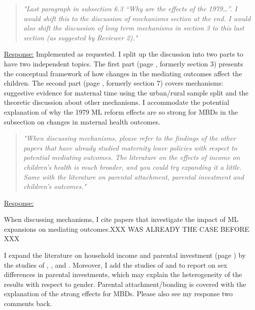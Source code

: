 \bigskip
\begin{quote}
	\textit{"Last paragraph in subsection 6.3 “Why are the effects of the 1979…”. I would shift this to the discussion of mechanisms section at the end. I would also shift the discussion of long term mechanisms in section 3 to this last section (as suggested by Reviewer 2)."}
\end{quote}
\underline{Response:} Implemented as requested. I split up the discussion into two parts to have two independent topics. The first part (page \pageref{rev_mlch: restructure_discussion_framework}, formerly section 3) presents the conceptual framework of how changes in the mediating outcomes affect the children. The second part (page \pageref{ref_mlch: discussion_mechanisms}, formerly section 7) covers mechanisms: suggestive evidence for maternal time using the urban/rural sample split and the theoretic discussion about other mechanisms. I accommodate the potential explanation of why the 1979 ML reform effects are so strong for MBDs in the subsection on changes in maternal health outcomes.


\bigskip
\begin{quote}
	\textit{"When discussing mechanisms, please refer to the findings of the other papers that have already studied maternity leave policies with respect to potential mediating outcomes. The literature on the effects of income on children’s health is much broader, and you could try expanding it a little. Same with the literature on parental attachment, parental investment and children’s outcomes."}
\end{quote}
\underline{Response:} 

{\color{red}When discussing mechanisms, I cite papers that investigate the impact of ML expansions on mediating outcomes.XXX WAS ALREADY THE CASE BEFORE XXX}

I expand the literature on household income and parental investment (page \pageref{rev_mlch: ed_literature_income_childhealth}) by the studies of \cite{milligan2011taxbenefits}, \cite{aizer2016cash-transfer}, and \cite{akee2018income}. Moreover, I add the studies of \cite{baker2016} and \cite{bharadwaj2013discrimination} to report on sex differences in parental investments, which may explain the heterogeneity of the results with respect to gender. Parental attachment/bonding is covered with the explanation of the strong effects for MBDs. Please also see my response two comments back.





